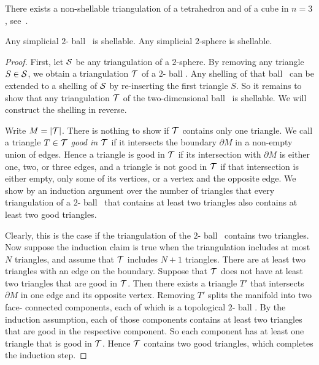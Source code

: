 \documentclass[10pt,letterpaper]{article}
\newcommand\cye[1]{%
  \protect\leavevmode
  \begingroup
    \color{red!35!yellow}%
    #1%
  \endgroup
}
\newcommand{\disk}{\cye{ball}}
\begin{document}
\cye{\begin{example}
    There exists a non-shellable triangulation of a tetrahedron and of a cube in $n=3$, see~\cite[Example 8.9]{ziegler1995lectures}.
\end{example}}


\begin{lemma}\label{lemma:shell_2D}
    Any simplicial $2$-\disk\ is shellable.
    Any simplicial $2$-sphere is shellable. 
\end{lemma}
\begin{proof}
    First, 
    let ${\mathcal S}$ be any triangulation of a $2$-sphere. 
    By removing any triangle $S \in {\mathcal S}$, we obtain a triangulation ${\mathcal T}$ of a $2$-\disk.
    Any shelling of that \disk\ can be extended to a shelling of ${\mathcal S}$ by re-inserting the first triangle $S$.
    So it remains to show that any triangulation ${\mathcal T}$ of the two-dimensional \disk\ is shellable. 
    We will construct the shelling in reverse. 
    
    Write $M = |{\mathcal T}|$. 
    There is nothing to show if ${\mathcal T}$ contains only one triangle. 
    We call a triangle $T \in {\mathcal T}$ \emph{good in ${\mathcal T}$} if it intersects the boundary $\partial M$ in a non-empty union of edges. 
    Hence a triangle is good in ${\mathcal T}$ if its intersection with $\partial M$ is either one, two, or three edges,
    and a triangle is not good in ${\mathcal T}$ if that intersection is either empty, only some of its vertices, or a vertex and the opposite edge.
    We show by an induction argument over the number of triangles that every triangulation of a $2$-\disk\ that contains at least two triangles also contains at least two good triangles. 

    Clearly, this is the case if the triangulation of the $2$-\disk\ contains two triangles. 
    Now suppose the induction claim is true when the triangulation includes at most $N$ triangles,
    and assume that ${\mathcal T}$ includes $N+1$ triangles. 
    There are at least two triangles with an edge on the boundary. 
    Suppose that ${\mathcal T}$ does not have at least two triangles that are good in ${\mathcal T}$.
    Then there exists a triangle $T'$ that intersects $\partial M$ 
    in one edge and its opposite vertex.
    Removing $T'$ splits the manifold into two \cye{face-}connected components, each of which is a topological $2$-\disk.
    By the induction assumption, each of those components contains at least two triangles 
    that are good in the respective component. 
    So each component has at least one triangle that is good in ${\mathcal T}$. 
    Hence ${\mathcal T}$ contains two good triangles, which completes the induction step. 
    

\end{proof}
\end{document}
